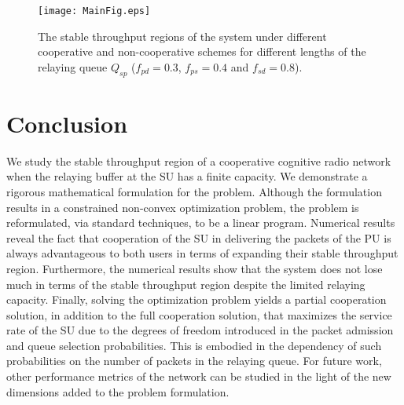 \documentclass[conference]{IEEEtran}
\begin{document}
\begin{figure}
\centering
\texttt{[image: MainFig.eps]}
\caption{The stable throughput regions of the system under different cooperative and non-cooperative schemes for different lengths of the relaying queue $Q_{sp}$ ($f_{pd}=0.3$, $f_{ps}=0.4$ and $f_{sd}=0.8$).}
\label{fig:throughout}
\end{figure}

\section{Conclusion}
We study the stable throughput region of a cooperative cognitive radio network when the relaying buffer at the SU has a finite capacity. We demonstrate a rigorous mathematical formulation for the problem. Although the formulation results in a constrained non-convex optimization problem, the problem is reformulated, via standard techniques, to be a linear program. Numerical results reveal the fact that cooperation of the SU in delivering the packets of the PU is always advantageous to both users in terms of expanding their stable throughput region. Furthermore, the numerical results show that the system does not lose much in terms of the stable throughput region despite the limited relaying capacity. Finally, solving the optimization problem yields a partial cooperation solution, in addition to the full cooperation solution, that maximizes the service rate of the SU due to the degrees of freedom introduced in the packet admission and queue selection probabilities. This is embodied in the dependency of such probabilities on the number of packets in the relaying queue. For future work, other performance metrics of the network can be studied in the light of the new dimensions added to the problem formulation.









\linespread{1}

\end{document}
